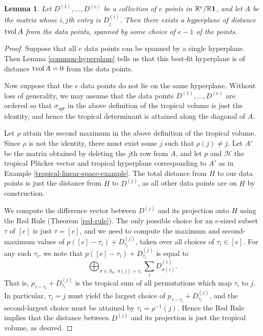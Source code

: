 \documentclass[12pt]{extarticle}
\numberwithin{theorem}{section}
\newtheorem{lemma}[theorem]{Lemma}
\newcommand{\RR}{\mathbb{R}}
\newcommand{\TP}{\mathbb{TP}}
\newcommand{\tvol}{\text{tvol\,}}
\begin{document}
\begin{lemma}\label{upper-bound}
Let $D^{(1)},\ldots, D^{(e)}$ be a collection of $e$ points in $\RR^e/\RR {\bf 1}$, and let $A$ be the matrix whose $i,j$th entry is $D^{(i)}_j$. Then there exists a hyperplane of distance $\tvol A$ from the data points, spanned by some choice of $e-1$ of the points.
\end{lemma}
\begin{proof}
Suppose that all $e$ data points can be spanned by a single hyperplane. Then Lemma \ref{common-hyperplane} tells us that this best-fit hyperplane is of distance $\tvol A = 0$ from the data points.

Now suppose that the $e$ data points do not lie on the same hyperplane. %
Without loss of generality, we may assume that the data points $D^{(1)},\ldots, D^{(e)}$ are ordered so that $\sigma_{opt}$ in the above definition of the tropical volume is just the identity, and hence the tropical determinant is attained along the diagonal of $A$.

Let $\rho$ attain the second maximum in the above definition of the tropical volume. Since $\rho$ is not the identity, there must exist some $j$ such that $\rho(j)\neq j$. %
Let $A'$ be the matrix obtained by deleting the $j$th row from $A$, and let $p$ and $\mathcal H$ the tropical Pl\"ucker vector and tropical hyperplane corresponding to $A'$ as in Example \ref{tropical-linear-space-example}. The total distance from $H$ to our data points is just the distance from $H$ to $D^{(j)}$, as all other data points are on $H$ by construction.

We compute the difference vector between $D^{(j)}$ and its projection onto $H$ using the Red Rule (Theorem \ref{red-rule}). The only possible choice for an $e$-sized subset $\tau$ of $[e]$ is just $\tau = [e]$, and we need to compute the maximum and second-maximum values of $p({[e]-\tau_i}) + D^{(j)}_{\tau_i}$, taken over all choices of $\tau_i\in [e]$. For any such $\tau_i$, we note that $p({[e]-\tau_i}) + D^{(j)}_{\tau_i}$ is equal to
\[\bigoplus_{\sigma\in S_d,\; \sigma(j)=\tau_i} \sum_i D_{\sigma(i)}^{(i)}.\]
That is, $p_{\tau-\tau_i}+D_{\tau_i}^{(j)}$ is the tropical sum of all permutations which map $\tau_i$ to $j$. In particular, $\tau_i = j$ must yield the largest choice of $p_{\tau-\tau_i}+D_{\tau_i}^{(j)}$, and the second-largest choice must be attained by $\tau_i=\rho^{-1}(j)$. Hence the Red Rule implies that the distance between $D^{(j)}$ and its projection is just the tropical volume, as desired.
\end{proof}
\end{document}

